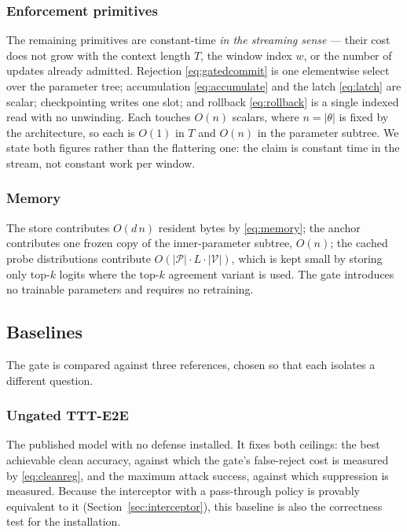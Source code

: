 \documentclass[journal]{IEEEtran}
\newcommand{\fast}{\theta}
\begin{document}
\subsubsection{Enforcement primitives}
The remaining primitives are constant-time \emph{in the streaming sense} --- their
cost does not grow with the context length $T$, the window index $w$, or the number
of updates already admitted. Rejection \eqref{eq:gatedcommit} is one elementwise
select over the parameter tree; accumulation \eqref{eq:accumulate} and the latch
\eqref{eq:latch} are scalar; checkpointing writes one slot; and rollback
\eqref{eq:rollback} is a single indexed read with no unwinding. Each touches $O(n)$
scalars, where $n = |\fast|$ is fixed by the architecture, so each is $O(1)$ in $T$
and $O(n)$ in the parameter subtree. We state both figures rather than the flattering
one: the claim is constant time in the stream, not constant work per window.

\subsubsection{Memory}
The store contributes $O(d\,n)$ resident bytes by \eqref{eq:memory}; the anchor
contributes one frozen copy of the inner-parameter subtree, $O(n)$; the cached probe
distributions contribute $O(|\mathcal{P}| \cdot L \cdot |\mathcal{V}|)$, which is
kept small by storing only top-$k$ logits where the top-$k$ agreement variant is
used. The gate introduces no trainable parameters and requires no retraining.

\subsection{Baselines}
\label{sec:baselines}

The gate is compared against three references, chosen so that each isolates a
different question.

\subsubsection{Ungated TTT-E2E}
The published model with no defense installed. It fixes both ceilings: the best
achievable clean accuracy, against which the gate's false-reject cost is measured by
\eqref{eq:cleanreg}, and the maximum attack success, against which suppression is
measured. Because the interceptor with a pass-through policy is provably equivalent
to it (Section~\ref{sec:interceptor}), this baseline is also the correctness test for
the installation.
\end{document}
